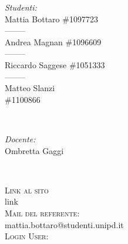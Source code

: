 \begin{titlepage}
	\begin{minipage}{0.4\textwidth}
	\begin{flushleft} \large
	\emph{Studenti:}\\
	Mattia Bottaro \#1097723 \\--------\\ Andrea Magnan \#1096609 \\--------\\ Riccardo Saggese \#1051333 \\--------\\ Matteo Slanzi \\ \#1100866
	\end{flushleft}
	\end{minipage}
	~
	\begin{minipage}{0.4\textwidth}
	\begin{flushright} \large
	\emph{Docente:} \\
	Ombretta Gaggi
	\end{flushright}
	\end{minipage}\\[2cm]
	
	
	
	
	
	
	
	\vfill %
	
	\end{titlepage}
	\newpage
	\textsc{\Large Link al sito\\ }link\\[0.5cm]
	\textsc{\Large Mail del referente:\\ }mattia.bottaro@studenti.unipd.it\\[0.5cm]
	\textsc{\Large Login User: }\\[0.5cm]
	\newpage
	\tableofcontents
	\listoffigures
	\listoftables
	\newpage
	
